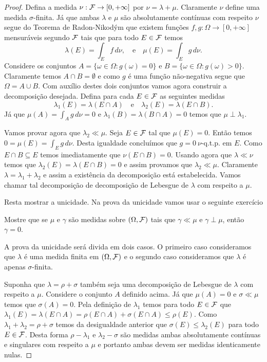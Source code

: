 \begin{proof}
Defina a medida $\nu:\mathcal{F}\to [0,+\infty]$ por
$\nu = \lambda+\mu$. Claramente $\nu$ define uma
medida $\sigma$-finita. 
Já que ambas $\lambda$ e $\mu$ são absolutamente contínuas
com respeito $\nu$ segue do Teorema de Radon-Nikodým 
que existem funções $f,g:\Omega\to [0,+\infty]$ mensuráveis
segundo $\mathcal{F}$ tais que para todo $E\in\mathcal{F}$ temos 
\[
\lambda(E)= \int_{E} f\, d\nu,
\quad\text{e}\quad
\mu(E)= \int_{E} g\, d\nu.
\] 
Considere os conjuntos $A=\{\omega\in\Omega: g(\omega)=0 \}$
e $B=\{\omega\in\Omega: g(\omega)>0\}$. Claramente temos 
$A\cap B =\emptyset$ e como $g$ é uma função 
não-negativa segue que $\Omega = A\cup B$. Com auxílio destes
dois conjuntos vamos agora construir a decomposição 
desejada. Defina para cada $E\in \mathcal{F}$ as seguintes medidas
\[
\lambda_1(E) = \lambda(E\cap A)
\quad\text{e}\quad
\lambda_2(E)= \lambda(E\cap B).
\]
Já que $\mu(A)=\int_A g\, d\nu = 0$
e $\lambda_1(B) = \lambda(B\cap A) =0 $ temos que 
$\mu \perp \lambda_1$.

Vamos provar agora que $\lambda_2\ll \mu$. 
Seja $E\in \mathcal{F}$ tal que $\mu(E)=0$. Então temos
$0= \mu(E)=\int_{E} g\, d\nu$. Desta igualdade 
concluímos que $g=0\ \nu$-q.t.p. em $E$. 
Como $E\cap B\subseteq E$ temos imediatamente 
que $\nu(E\cap B)=0$. Usando agora que $\lambda\ll \nu$
temos que $\lambda_2(E)=\lambda(E\cap B) = 0$  
e assim provamos que $\lambda_2\ll \mu$.
Claramente $\lambda =\lambda_1+\lambda_2$ e assim 
a existência da decomposição está estabelecida. 
Vamos chamar tal decomposição de decomposição 
de Lebesgue de $\lambda$ com respeito a $\mu$.

Resta mostrar a unicidade. 
Na prova da unicidade vamos usar o seguinte 
exercício 
\begin{exercicio}
Mostre que se $\mu$ e $\gamma$ são medidas 
sobre $(\Omega,\mathcal{F})$ tais que  
$\gamma\ll \mu$ e $\gamma\perp \mu$, então 
$\gamma= 0$.
\end{exercicio}
%
A prova da unicidade será divida em 
dois casos. O primeiro caso consideramos que $\lambda$
é uma medida finita em $(\Omega,\mathcal{F})$ e o segundo
caso consideramos que $\lambda$ é apenas $\sigma$-finita. 

Suponha que   
$\lambda = \rho+\sigma$ 
também seja uma decomposição de Lebesgue de $\lambda$ 
com respeito a $\mu$. Considere o conjunto $A$
definido acima. Já que $\mu(A)=0$ e $\sigma \ll \mu$
temos que $\sigma(A)=0$. Pela definição de $\lambda_1$
temos para todo $E\in\mathcal{F}$ que
$\lambda_1(E) = \lambda(E\cap A) = \rho(E\cap A)+\sigma(E\cap A)
\leq \rho(E)$. Como $\lambda_1+\lambda_2 = \rho+\sigma$
temos da desigualdade anterior que $\sigma(E)\leq \lambda_2(E)$ 
para todo $E\in\mathcal{F}$. Desta forma $\rho-\lambda_1$ e 
$\lambda_2-\sigma$ são medidas ambas absolutamente
contínuas e singulares com respeito a $\mu$ e 
portanto ambas devem ser medidas identicamente nulas.
\end{proof}

